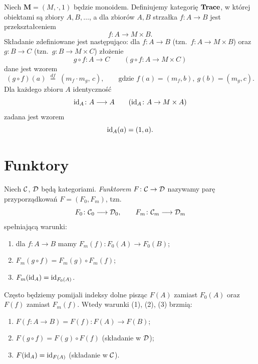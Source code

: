 \begin{przyklad}
Niech $\mathbf{M} = (M, \cdot, 1)$ będzie monoidem. Definiujemy kategorię $\mathbf{Trace}$, w której obiektami są zbiory $A, B, \ldots$, a dla zbiorów $A, B$ strzałka $f \colon A \to B$ jest przekształceniem
\[
f \colon A \longrightarrow M \times B.
\]
Składanie zdefiniowane jest następująco: dla $f \colon A \to B$ (tzn.\ $f \colon A \to M \times B$) oraz $g \colon B \to C$ (tzn.\ $g \colon B \to M \times C$) złożenie
\[
g \circ f \colon A \longrightarrow C \qquad (g \circ f \colon A \to M \times C)
\]
dane jest wzorem
\[
(g \circ f)(a) \;\stackrel{df}{=}\; (m_f \cdot m_g, \, c), \qquad \text{gdzie } f(a) = (m_f, b), \ g(b) = (m_g, c).
\]
Dla każdego zbioru $A$ identyczność
\[
\mathrm{id}_A \colon A \longrightarrow A \qquad (\mathrm{id}_A \colon A \to M \times A)
\]
zadana jest wzorem
\[
\mathrm{id}_A(a) = (1, a).
\]
\end{przyklad}

\section{Funktory}

\begin{definicja}
Niech $\mathcal{C}$, $\mathcal{D}$ będą kategoriami. \emph{Funktorem} $F \colon \mathcal{C} \to \mathcal{D}$ nazywamy parę przyporządkowań $F = (F_0, F_m)$, tzn.
\[
F_0 \colon \mathcal{C}_0 \longrightarrow \mathcal{D}_0, \qquad F_m \colon \mathcal{C}_m \longrightarrow \mathcal{D}_m
\]
spełniającą warunki:
\begin{enumerate}
\item dla $f \colon A \to B$ mamy $F_m(f) \colon F_0(A) \to F_0(B)$;
\item $F_m(g \circ f) = F_m(g) \circ F_m(f)$;
\item $F_m(\mathrm{id}_A) = \mathrm{id}_{F_0(A)}$.
\end{enumerate}
\end{definicja}

\begin{uwaga}[Notacja]
Często będziemy pomijali indeksy dolne pisząc $F(A)$ zamiast $F_0(A)$ oraz $F(f)$ zamiast $F_m(f)$. Wtedy warunki (1), (2), (3) brzmią:
\begin{enumerate}
\item $F(f \colon A \to B) = F(f) \colon F(A) \to F(B)$;
\item $F(g \circ f) = F(g) \circ F(f)$ \quad (składanie w $\mathcal{D}$);
\item $F(\mathrm{id}_A) = \mathrm{id}_{F(A)}$ \quad (składanie w $\mathcal{C}$).
\end{enumerate}
\end{uwaga}

